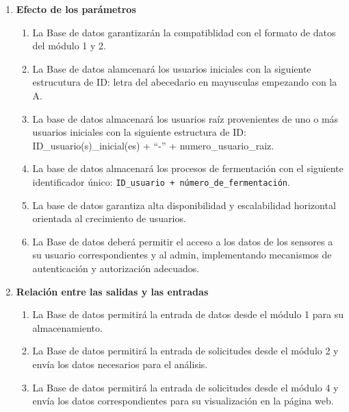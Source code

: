 \begin{enumerate}
\begin{enumerate}
            \item \textbf{Efecto de los parámetros}
                \begin{enumerate}
                    \item La Base de datos garantizarán la compatiblidad con el formato de datos del módulo 1 y 2.
                    \item La Base de datos alamcenará los usuarios iniciales con la siguiente estrucutura de ID: letra del abecedario en mayusculas empezando con la A.
                 \item La base de datos almacenará los usuarios raíz provenientes de uno o más usuarios iniciales con la siguiente estructura de ID:
                 ID\_usuario(s)\_inicial(es) + ``-'' + numero\_usuario\_raiz.


                    \item La base de datos almacenará los procesos de fermentación con el siguiente identificador único:
                    \texttt{ID\_usuario + número\_de\_fermentación}.

                    \item La base de datos garantiza alta disponibilidad y escalabilidad horizontal orientada al crecimiento de usuarios.

                    \item La Base de datos deberá permitir el acceso a los datos de los sensores a su usuario correspondientes y al admin, implementando mecanismos de autenticación y autorización adecuados.
                \end{enumerate}   
        
            \item \textbf{Relación entre las salidas y las entradas}
                \begin{enumerate}
                    \item La Base de datos permitirá la entrada de datos desde el módulo 1 para su almacenamiento.
                    \item La Base de datos permitirá la entrada de solicitudes desde el módulo 2 y envía los datos necesarios para el análisis.
                    \item La Base de datos permitirá la entrada de solicitudes desde el módulo 4 y envía los datos correspondientes para su visualización en la página web.
                \end{enumerate}
    \end{enumerate}

 \end{enumerate}

